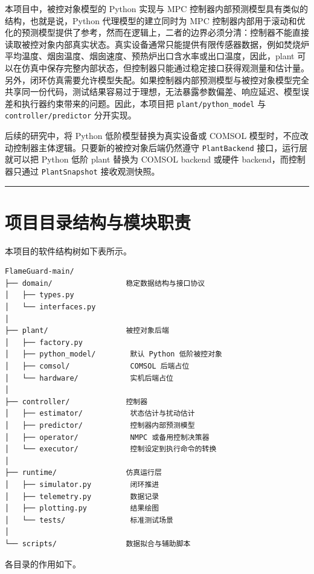 \documentclass[UTF8,openany,zihao=-4,oneside]{ctexbook}
\providecommand{\passthrough}[1]{#1}
\newcommand{\manualdivider}{\par\vspace{0.6em}\noindent\textcolor{FGLine}{\rule{\linewidth}{0.7pt}}\vspace{0.6em}\par}
\begin{document}
本项目中，被控对象模型的 Python 实现与 MPC 控制器内部预测模型具有类似的结构，也就是说，Python 代理模型的建立同时为 MPC 控制器内部用于滚动和优化的预测模型提供了参考，然而在逻辑上，二者的边界必须分清：控制器不能直接读取被控对象内部真实状态。真实设备通常只能提供有限传感器数据，例如焚烧炉平均温度、烟囱温度、烟囱速度、预热炉出口含水率或出口温度，因此，plant 可以在仿真中保存完整内部状态，但控制器只能通过稳定接口获得观测量和估计量。另外，闭环仿真需要允许模型失配。如果控制器内部预测模型与被控对象模型完全共享同一份代码，测试结果容易过于理想，无法暴露参数偏差、响应延迟、模型误差和执行器约束带来的问题。因此，本项目把 \passthrough{\lstinline!plant/python_model!} 与 \passthrough{\lstinline!controller/predictor!} 分开实现。

后续的研究中，将 Python 低阶模型替换为真实设备或 COMSOL 模型时，不应改动控制器主体逻辑。只要新的被控对象后端仍然遵守 \passthrough{\lstinline!PlantBackend!} 接口，运行层就可以把 Python 低阶 plant 替换为 COMSOL backend 或硬件 backend，而控制器只通过 \passthrough{\lstinline!PlantSnapshot!} 接收观测快照。

\manualdivider

\section{项目目录结构与模块职责}\label{ux9879ux76eeux76eeux5f55ux7ed3ux6784ux4e0eux6a21ux5757ux804cux8d23}

本项目的软件结构树如下表所示。

\begin{lstlisting}
FlameGuard-main/
├── domain/                 稳定数据结构与接口协议
│   ├── types.py
│   └── interfaces.py
│
├── plant/                  被控对象后端
│   ├── factory.py
│   ├── python_model/        默认 Python 低阶被控对象
│   ├── comsol/              COMSOL 后端占位
│   └── hardware/            实机后端占位
│
├── controller/             控制器
│   ├── estimator/           状态估计与扰动估计
│   ├── predictor/           控制器内部预测模型
│   ├── operator/            NMPC 或备用控制决策器
│   └── executor/            控制设定到执行命令的转换
│
├── runtime/                仿真运行层
│   ├── simulator.py         闭环推进
│   ├── telemetry.py         数据记录
│   ├── plotting.py          结果绘图
│   └── tests/               标准测试场景
│
└── scripts/                数据拟合与辅助脚本
\end{lstlisting}

各目录的作用如下。
\end{document}
